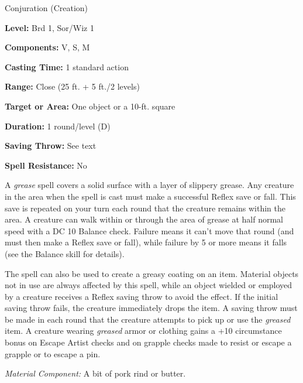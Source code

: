 
Conjuration (Creation)

\textbf{Level:} Brd 1, Sor/Wiz 1

\textbf{Components:} V, S, M

\textbf{Casting Time:} 1 standard action

\textbf{Range:} Close (25 ft. + 5 ft./2 levels)

\textbf{Target or Area:} One object or a 10-ft. square

\textbf{Duration:} 1 round/level (D)

\textbf{Saving Throw:} See text

\textbf{Spell Resistance:} No

A \textit{grease} spell covers a solid surface with a layer of slippery grease. 
Any creature in the area when the spell is cast must make a successful Reflex save 
or fall. This save is repeated on your turn each round that the creature remains 
within the area. A creature can walk within or through the area of grease at half 
normal speed with a DC 10 Balance check. Failure means it can't move that round 
(and must then make a Reflex save or fall), while failure by 5 or more means it 
falls (see the Balance skill for details).

The spell can also be used to create a greasy coating on an item. Material objects 
not in use are always affected by this spell, while an object wielded or employed 
by a creature receives a Reflex saving throw to avoid the effect. If the initial 
saving throw fails, the creature immediately drops the item. A saving throw must 
be made in each round that the creature attempts to pick up or use the \textit{greased 
}item. A creature wearing \textit{greased} armor or clothing gains a +10 circumstance 
bonus on Escape Artist checks and on grapple checks made to resist or escape a 
grapple or to escape a pin.

\textit{Material Component:} A bit of pork rind or butter.

